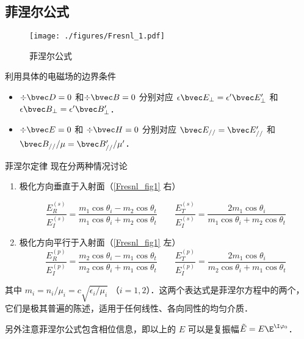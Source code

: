 
\begin{issues}
\issueTODO
\end{issues}


\subsection{菲涅尔公式}
\begin{figure}[ht]
\centering
\texttt{[image: ./figures/Fresnl\_1.pdf]}
\caption{菲涅尔公式} \label{Fresnl_fig1}
\end{figure}
 
利用具体的电磁场的边界条件 %
\begin{itemize}
\item $\div \bvec D = 0$ 和$\div \bvec B = 0$  分别对应 $\epsilon \bvec E_\bot = \epsilon' \bvec E'_\bot$ 和 $\epsilon \bvec B_\bot = \epsilon' \bvec B'_\bot$．

\item $\div \bvec E = 0$ 和 $\div \bvec H = 0$ 分别对应 $\bvec E_{//} = \bvec E'_{//}$ 和 $\bvec B_{//}/\mu = \bvec B'_{//}/\mu'$．
\end{itemize}

\begin{theorem}{菲涅尔定律}
现在分两种情况讨论
\begin{enumerate}
\item 极化方向垂直于入射面（\autoref{Fresnl_fig1} 右）

\begin{equation}
\frac{E_R^{(s)}}{E_I^{(s)}} =  \frac{m_1\cos{\theta_i} - m_2\cos\theta_t}{m_1\cos\theta_i + m_2\cos\theta_t}
\qquad
\frac{E_T^{(s)}}{E_I^{(s)}} = \frac{2 m_1\cos\theta_i}{m_1\cos\theta_i + m_2\cos\theta_t}
\end{equation}

\item 极化方向平行于入射面（\autoref{Fresnl_fig1} 左）
\begin{equation}\label{Fresnl_eq2}
\frac{E_R^{(p)}}{E_I^{(p)}} =  \frac{m_2\cos\theta_i - m_1\cos\theta_t}{m_2 \cos\theta_i + m_1\cos\theta_t}
\qquad
\frac{E_T^{(p)}}{E_I^{(p)}} =  \frac{2 m_1\cos\theta_i}{m_2\cos\theta_i + m_1\cos\theta_t}
\end{equation}
\end{enumerate}
其中 $m_i=n_i/\mu_i = c\sqrt{\epsilon_i/\mu_i}$ （$i=1,2$）．这两个表达式是菲涅尔方程中的两个，它们是极其普遍的陈述，适用于任何线性、各向同性的均匀介质．

另外注意菲涅尔公式包含相位信息，即以上的 $E$ 可以是复振幅$\tilde E=E \E^{\I \varphi_0}$． 
\end{theorem}

